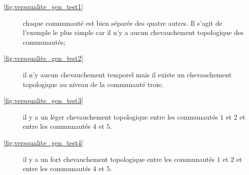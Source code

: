 \begin{description}
\item[\ref{fig:versqualite_gen_test1}] chaque communauté est bien séparée des quatre autres. Il s'agit de l'exemple le plus simple car il n'y a aucun chevauchement topologique des communautés;
\item[\ref{fig:versqualite_gen_test2}] il n'y aucun chevauchement temporel mais il existe un chevauchement topologique au niveau de la communauté trois;
\item[\ref{fig:versqualite_gen_test3}] il y a un léger chevauchement topologique entre les communautés $1$ et $2$ et entre les communautés $4$ et $5$.
\item[\ref{fig:versqualite_gen_test4}] il y a un fort chevauchement topologique entre les communautés $1$ et $2$ et entre les communautés $4$ et $5$.
\end{description}


